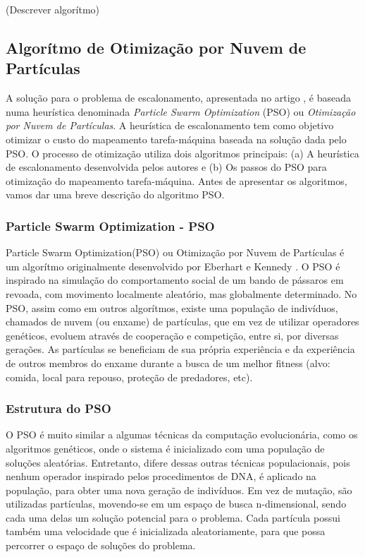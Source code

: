 \documentclass[a4paper,10pt]{article}
\begin{document}
(Descrever algorítmo)

\subsection{Algorítmo de Otimização por Nuvem de Partículas}
\label{psoalgo}
A solução para o problema de escalonamento, apresentada no artigo \cite{pso_a}, é baseada numa heurística 
denominada \emph{Particle Swarm Optimization} (PSO) ou \emph{Otimização por Nuvem de Partículas}. A heurística de 
escalonamento tem como objetivo otimizar 
o custo do mapeamento tarefa-máquina baseada na solução dada pelo PSO. O processo de otimização utiliza 
dois algoritmos principais: (a) A heurística de escalonamento desenvolvida pelos autores e (b) Os passos do PSO 
para otimização do mapeamento tarefa-máquina. Antes de apresentar os algoritmos, vamos 
dar uma breve descrição do algoritmo PSO.

\subsubsection{Particle Swarm Optimization - PSO}

Particle Swarm Optimization(PSO) ou Otimização por Nuvem de Partículas é um algorítmo originalmente 
desenvolvido por Eberhart e Kennedy \cite{pso_article}. O PSO é inspirado na simulação do comportamento social de um 
bando de pássaros em revoada, com movimento localmente aleatório, mas globalmente determinado. No PSO, 
assim como em outros algorítmos, existe uma população de indivíduos, chamados de nuvem (ou enxame) de 
partículas, que em vez de utilizar operadores genéticos, evoluem através de cooperação e competição, entre si, 
por diversas gerações. As partículas se beneficiam de sua própria experiência e da experiência de outros membros 
do enxame durante a busca de um melhor fitness (alvo: comida, local para repouso, proteção de predadores, etc).

\subsubsection{Estrutura do PSO}

O PSO é muito similar a algumas técnicas da computação evolucionária, como os algoritmos genéticos, onde o 
sistema é inicializado com uma população de soluções aleatórias. Entretanto, difere dessas outras técnicas 
populacionais, pois nenhum operador inspirado pelos procedimentos de DNA, é aplicado na população, para obter 
uma nova geração de indivíduos. Em vez de mutação, são utilizadas partículas, movendo-se em um espaço de busca 
n-dimensional, sendo cada uma delas um solução potencial para o problema. Cada partícula possui também uma 
velocidade que é inicializada aleatoriamente, para que possa percorrer o espaço de soluções do problema.
\end{document}
